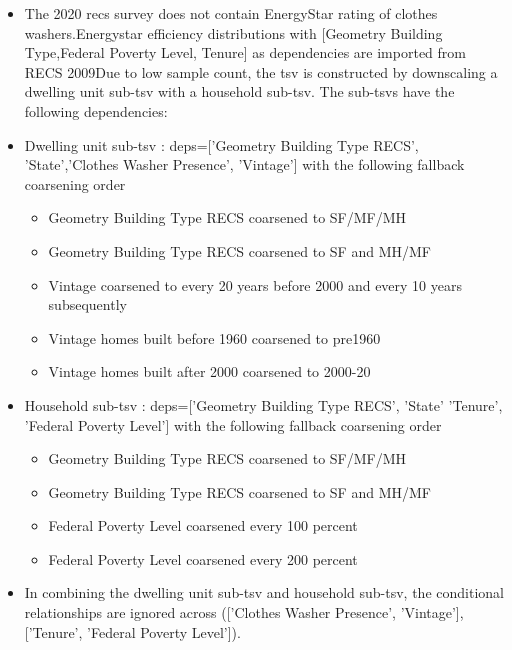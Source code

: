 \begin{itemize}
\item The 2020 recs survey does not contain EnergyStar rating of clothes washers.Energystar efficiency distributions with [Geometry Building Type,Federal Poverty Level, Tenure] as dependencies are imported from RECS 2009Due to low sample count, the tsv is constructed by downscaling a dwelling unit sub-tsv with a household sub-tsv. The sub-tsvs have the following dependencies:
\item Dwelling unit sub-tsv : deps=['Geometry Building Type RECS', 'State','Clothes Washer Presence', 'Vintage'] with the following fallback coarsening order
  \begin{itemize}
  \item Geometry Building Type RECS coarsened to SF/MF/MH
  \item Geometry Building Type RECS coarsened to SF and MH/MF
  \item Vintage coarsened to every 20 years before 2000 and every 10 years subsequently
  \item Vintage homes built before 1960 coarsened to pre1960
  \item Vintage homes built after 2000 coarsened to 2000-20
  \end{itemize}
\item Household sub-tsv : deps=['Geometry Building Type RECS', 'State' 'Tenure', 'Federal Poverty Level'] with the following fallback coarsening order
  \begin{itemize}
  \item Geometry Building Type RECS coarsened to SF/MF/MH
  \item Geometry Building Type RECS coarsened to SF and MH/MF
  \item Federal Poverty Level coarsened every 100 percent
  \item Federal Poverty Level coarsened every 200 percent
  \end{itemize}
\item In combining the dwelling unit sub-tsv and household sub-tsv, the conditional relationships are ignored across (['Clothes Washer Presence', 'Vintage'], ['Tenure', 'Federal Poverty Level']).
\end{itemize}
